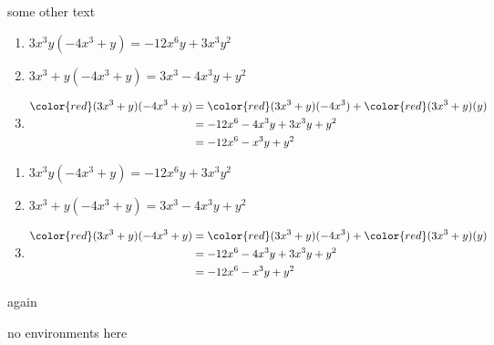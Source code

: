 some 
other 
text
\begin{enumerate}
	\item $3x^3y(-4x^3+y) = -12x^6y+3x^3y^2$
	\item $3x^3+y(-4x^3+y) = 3x^3-4x^3y+y^2$
	\item \begin{align*}
	{\color{red}(3x^3+y)}(-4x^3+y) & =	{\color{red}(3x^3+y)}(-4x^3)+{\color{red}(3x^3+y)}(y) \\
	& =	-12x^6-4x^3y+3x^3y+y^2                                \\
	& =	-12x^6-x^3y+y^2                                       
	\end{align*}
\end{enumerate}
\begin{enumerate}
	\item $3x^3y(-4x^3+y) = -12x^6y+3x^3y^2$
	\item $3x^3+y(-4x^3+y) = 3x^3-4x^3y+y^2$
	\item 
	\begin{align*}
		{\color{red}(3x^3+y)}(-4x^3+y) & =	{\color{red}(3x^3+y)}(-4x^3)+{\color{red}(3x^3+y)}(y) \\
		                               & =	-12x^6-4x^3y+3x^3y+y^2                                \\
		                               & =	-12x^6-x^3y+y^2                                       
	\end{align*}
\end{enumerate}
	
\begin{something}
	\begin{else}
		again
	\end{else}
\end{something}
no
environments
here
